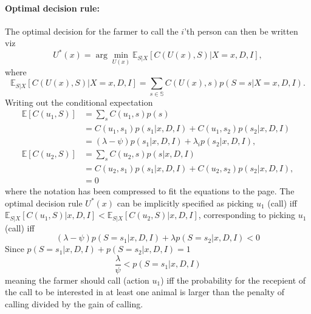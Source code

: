 \begin{example}
	\paragraph{Optimal decision rule:} The optimal decision for the farmer to call the $i$'th person can then be written viz
	\begin{equation}
		U^*(x) = \arg\min_{U(x)} \mathbb{E}_{S|X}[C(U(x), S)|X=x,D,I],
	\end{equation}
	where
	\begin{equation}
		\mathbb{E}_{S|X}[C(U(x), S)|X=x,D,I] = \sum_{s\in \mathbb{S}} C(U(x),s) p(S=s|X=x,D,I).
	\end{equation}
	Writing out the conditional expectation
	\begin{equation}
		\begin{split}
			\mathbb{E}[C(u_1, S)] & = \sum_sC(u_1,s)p(s)\\
			& = C(u_1,s_1)p(s_1|x,D,I) + C(u_1,s_2)p(s_2|x,D,I)\\
			& = (\lambda-\psi)p(s_1|x,D,I) + \lambda_i p(s_2|x,D,I),\\
			\mathbb{E}[C(u_2, S)] & = \sum_sC(u_2,s)p(s|x,D,I)\\
			& = C(u_2,s_1)p(s_1|x,D,I) + C(u_2,s_2)p(s_2|x,D,I),\\
			&=0
		\end{split}
	\end{equation}
	where the notation has been compressed to fit the equations to the page. The optimal decision rule $U^*(x)$ can be implicitly specified as picking $u_1$ (call) iff $\mathbb{E}_{S|X}[C(u_1, S)|x,D,I]<\mathbb{E}_{S|X}[C(u_2, S)|x,D,I]$, corresponding to picking $u_1$ (call) iff
	\begin{equation}
		(\lambda-\psi)p(S= s_1|x,D,I) + \lambda p(S= s_2|x,D,I) <0
	\end{equation}
	Since $p(S= s_1|x,D,I) +p(S= s_2|x,D,I) = 1$
	\begin{equation}
		\frac{\lambda}{\psi} < p(S= s_1|x,D,I)
		\label{eq:decision_rule}
	\end{equation}
	meaning the farmer should call (action $u_1$) iff the probability for the recepient of the call to be interested in at least one animal is larger than the penalty of calling divided by the gain of calling. 
	

\end{example}
